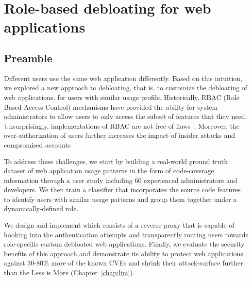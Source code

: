 \chapter{Role-based debloating for web applications}
\label{chap:dbltr}

\section*{Preamble}
Different users use the same web application differently. 
Based on this intuition, we explored a new approach to debloating, that is, to customize the debloating of web applications, for users with similar usage profile. 
Historically, RBAC (Role Based Access Control) mechanisms have provided the ability for system administrators to allow users to only access the subset of features that they need. 
Unsurprisingly, implementations of RBAC are not free of flaws~\cite{doupe2011fear, dalton2009nemesis, wpfilemanager}. 
Moreover, the over-authorization of users further increases the impact of insider attacks and compromised accounts~\cite{twitterviphack, oktahack}.

To address these challenges, we start by building a real-world ground truth dataset of web application usage patterns in the form of code-coverage information through a user study including 60 experienced administrators and developers. 
We then train a classifier that incorporates the source code features to identify users with similar usage patterns and group them together under a dynamically-defined role. 

We design and implement \dbltr{} which consists of a reverse-proxy that is capable of hooking into the authentication attempts and transparently routing users towards role-specific custom debloated web applications. 
Finally, we evaluate the security benefits of this approach and demonstrate its ability to protect web applications against 30-80\% more of the known CVEs and shrink their attack-surface further than the Less is More (Chapter~\ref{chap:lim}). 







